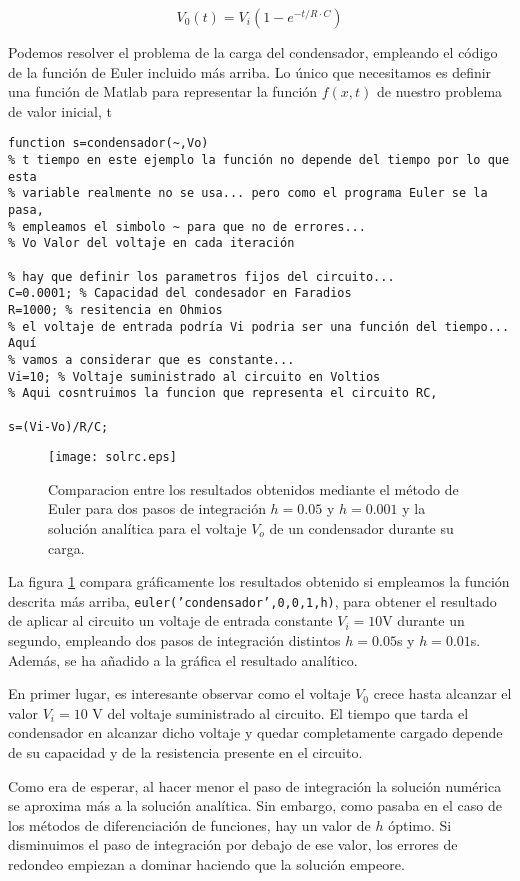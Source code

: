 \begin{equation*}
V_0(t)=V_i\left(1-e^{-t/R\cdot C}\right)
\end{equation*} 


Podemos resolver el problema de la carga del condensador, empleando el código de la función de Euler incluido más arriba. Lo único que necesitamos es definir una función de Matlab  para representar la función $f(x,t)$ de nuestro problema de valor inicial, t
\begin{lstlisting}
function s=condensador(~,Vo)
% t tiempo en este ejemplo la función no depende del tiempo por lo que esta
% variable realmente no se usa... pero como el programa Euler se la pasa, 
% empleamos el simbolo ~ para que no de errores...
% Vo Valor del voltaje en cada iteración

% hay que definir los parametros fijos del circuito...
C=0.0001; % Capacidad del condesador en Faradios
R=1000; % resitencia en Ohmios
% el voltaje de entrada podría Vi podria ser una función del tiempo... Aquí
% vamos a considerar que es constante...
Vi=10; % Voltaje suministrado al circuito en Voltios
% Aqui cosntruimos la funcion que representa el circuito RC,

s=(Vi-Vo)/R/C;
\end{lstlisting}

\begin{figure}[h]
\centering
\texttt{[image: solrc.eps]}
\caption{Comparacion entre los resultados obtenidos mediante el método de Euler para dos pasos de integración $h=0.05$ y $h=0.001$ y la solución analítica para el voltaje $V_o$ de un condensador durante su carga.}
\label{fig:solrc}
\end{figure}

La figura \ref{fig:solrc} compara gráficamente los resultados obtenido si empleamos la función descrita más arriba, \texttt{euler('condensador',0,0,1,h)}, para obtener el resultado de aplicar al circuito un voltaje de entrada constante $V_i=10$V durante un segundo, empleando dos pasos de integración distintos $h=0.05$s  y $h=0.01$s. Además, se ha añadido a la gráfica el resultado analítico.

En primer lugar, es interesante observar como el voltaje $V_0$ crece hasta alcanzar el valor $V_i=10$ V del voltaje suministrado al circuito. El tiempo que tarda el condensador en alcanzar dicho voltaje y quedar completamente cargado depende de su capacidad y de la resistencia presente en el circuito.

Como era de esperar, al hacer menor el paso de integración la solución numérica se aproxima más a la solución analítica. Sin embargo, como pasaba en el caso de los métodos de diferenciación de funciones, hay un valor de $h$ óptimo. Si disminuimos el paso de integración por debajo de ese valor, los errores de redondeo empiezan a dominar haciendo que la solución empeore.

